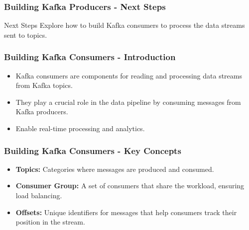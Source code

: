 \documentclass[aspectratio=169]{beamer}
\begin{document}
\begin{frame}[fragile]
    \frametitle{Building Kafka Producers - Next Steps}
    \begin{block}{Next Steps}
        Explore how to build Kafka consumers to process the data streams sent to topics.
    \end{block}
\end{frame}

\begin{frame}[fragile]
    \frametitle{Building Kafka Consumers - Introduction}
    \begin{itemize}
        \item Kafka consumers are components for reading and processing data streams from Kafka topics.
        \item They play a crucial role in the data pipeline by consuming messages from Kafka producers.
        \item Enable real-time processing and analytics.
    \end{itemize}
\end{frame}

\begin{frame}[fragile]
    \frametitle{Building Kafka Consumers - Key Concepts}
    \begin{itemize}
        \item \textbf{Topics:} Categories where messages are produced and consumed.
        \item \textbf{Consumer Group:} A set of consumers that share the workload, ensuring load balancing.
        \item \textbf{Offsets:} Unique identifiers for messages that help consumers track their position in the stream.
    \end{itemize}
\end{frame}
\end{document}
